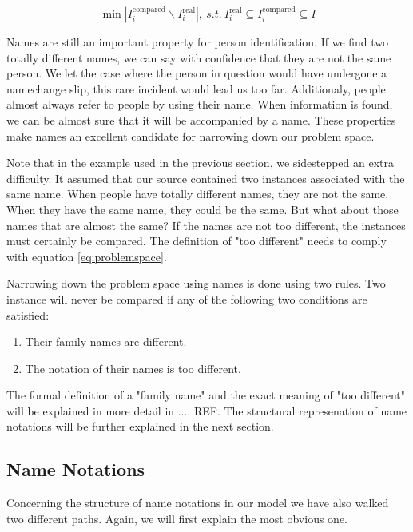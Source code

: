 \begin{equation}
\min |I^\text{compared}_i\backslash I^\text{real}_i|,\ s.t.\ I^\text{real}_i \subseteq I^\text{compared}_i \subseteq I
\label{eq:problemspace}
\end{equation}

Names are still an important property for person identification. If we find two totally different names, we can say with confidence that they are not the same person. We let the case where the person in question would have undergone a namechange slip, this rare incident would lead us too far. Additionaly, people almost always refer to people by using their name. When information is found, we can be almost sure that it will be accompanied by a name. These properties make names an excellent candidate for narrowing down our problem space.

Note that in the example used in the previous section, we sidestepped an extra difficulty. It assumed that our source contained two instances associated with the same name. When people have totally different names, they are not the same. When they have the same name, they could be the same. But what about those names that are almost the same? If the names are not too different, the instances must certainly be compared. The definition of "too different" needs to comply with equation \autoref{eq:problemspace}.

Narrowing down the problem space using names is done using two rules. Two instance will never be compared if any of the following two conditions are satisfied:

\begin{enumerate}
\item Their family names are different.
\item The notation of their names is too different.
\end{enumerate}

The formal definition of a "family name" and the exact meaning of "too different" will be explained in more detail in .... REF. The structural represenation of name notations will be further explained in the next section.

\subsection{Name Notations}

Concerning the structure of name notations in our model we have also walked two different paths. Again, we will first explain the most obvious one. 

